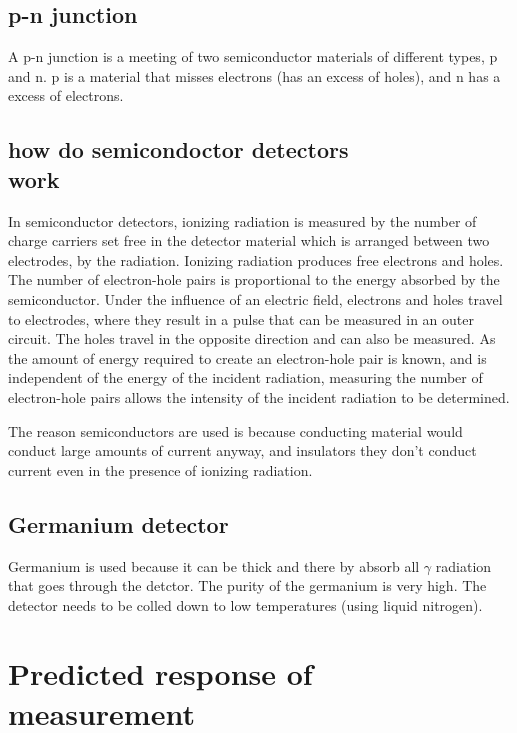 \documentclass[]{article}
\begin{document}
\subsection{p-n junction}


A p-n junction is a meeting of two semiconductor materials of different types, p and n. p is a material that misses electrons (has an excess of holes), and n has a excess of electrons.

\subsection{how do semicondoctor detectors \\ work}

In semiconductor detectors, ionizing radiation is measured by the number of charge carriers set free in the detector material which is arranged between two electrodes, by the radiation. Ionizing radiation produces free electrons and holes. The number of electron-hole pairs is proportional to the energy absorbed by the semiconductor. Under the influence of an electric field, electrons and holes travel to electrodes, where they result in a pulse that can be measured in an outer circuit. The holes travel in the opposite direction and can also be measured. As the amount of energy required to create an electron-hole pair is known, and is independent of the energy of the incident radiation, measuring the number of electron-hole pairs allows the intensity of the incident radiation to be determined.

The reason semiconductors are used is because conducting material would conduct large amounts of current anyway, and insulators they don't conduct current even in the presence of ionizing radiation. 

\subsection{Germanium detector}

Germanium is used because it can be thick and there by absorb all $\gamma$ radiation that goes through the detctor. The purity of the germanium is very high. The detector needs to be colled down to low temperatures (using liquid nitrogen). 

\section{Predicted response of \\ measurement}
\end{document}
